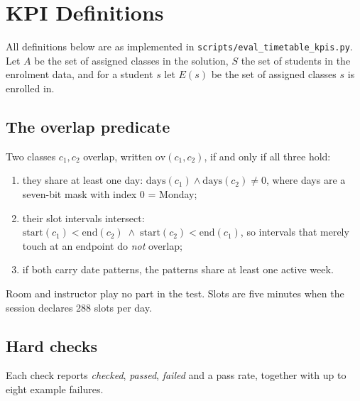 \section{KPI Definitions}
\label{app:kpis}

All definitions below are as implemented in \texttt{scripts/eval\_timetable\_kpis.py}. Let $A$ be
the set of assigned classes in the solution, $S$ the set of students in the enrolment data, and
for a student $s$ let $E(s)$ be the set of assigned classes $s$ is enrolled in.

\subsection{The overlap predicate}

Two classes $c_1, c_2$ overlap, written $\mathrm{ov}(c_1,c_2)$, if and only if all three hold:

\begin{enumerate}
  \item they share at least one day: $\mathrm{days}(c_1) \land \mathrm{days}(c_2) \neq 0$, where
    days are a seven-bit mask with index 0 = Monday;
  \item their slot intervals intersect:
    $\mathrm{start}(c_1) < \mathrm{end}(c_2) \;\wedge\; \mathrm{start}(c_2) < \mathrm{end}(c_1)$,
    so intervals that merely touch at an endpoint do \emph{not} overlap;
  \item if both carry date patterns, the patterns share at least one active week.
\end{enumerate}

Room and instructor play no part in the test. Slots are five minutes when the session declares 288
slots per day.

\subsection{Hard checks}

Each check reports \emph{checked}, \emph{passed}, \emph{failed} and a pass rate, together with up
to eight example failures.

